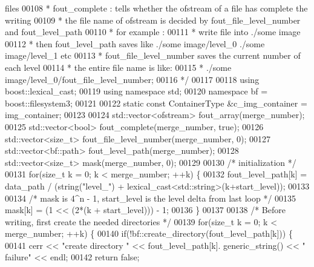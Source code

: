\begin{DoxyCode}
{       files}
00108 \textcolor{comment}{        *       fout\_complete : tells whether the ofstream of a file has
       complete the writing}
00109 \textcolor{comment}{        *       the file name of ofstream is decided by fout\_file\_level\_number
       and fout\_level\_path}
00110 \textcolor{comment}{        *       for example :}
00111 \textcolor{comment}{        *       write file into ./some image}
00112 \textcolor{comment}{        *       then fout\_level\_path saves like ./some image/level\_0 ./some
       image/level\_1        etc}
00113 \textcolor{comment}{        *       fout\_file\_level\_number saves the current number of each level}
00114 \textcolor{comment}{        *       the entire file name is like:}
00115 \textcolor{comment}{        *       ./some image/level\_0/fout\_file\_level\_number;}
00116 \textcolor{comment}{        */}
00117 
00118         \textcolor{keyword}{using} boost::lexical\_cast;
00119         \textcolor{keyword}{using namespace }std;
00120         \textcolor{keyword}{namespace }bf = boost::filesystem3;
00121 
00122         \textcolor{keyword}{static} \textcolor{keyword}{const} ContainerType &c\_img\_container = img\_container;
00123 
00124         std::vector<ofstream> fout\_array(merge\_number);
00125         std::vector<bool> fout\_complete(merge\_number, \textcolor{keyword}{true});
00126         std::vector<size\_t> fout\_file\_level\_number(merge\_number, 0);
00127         std::vector<bf::path> fout\_level\_path(merge\_number);
00128         std::vector<size\_t> mask(merge\_number, 0);
00129 
00130         \textcolor{comment}{/* initialization */}
00131         \textcolor{keywordflow}{for}(\textcolor{keywordtype}{size\_t} k = 0; k < merge\_number; ++k) \{
00132                 fout\_level\_path[k] = data\_path / (string(\textcolor{stringliteral}{"level\_"}) + 
      lexical\_cast<std::string>(k+start\_level));
00133 
00134                 \textcolor{comment}{/* mask is 4^n - 1, start\_level is the level delta from last
       loop */}
00135                 mask[k] = (1 << (2*(k + start\_level))) - 1;
00136         \}
00137 
00138         \textcolor{comment}{/* Before writing, first create the needed directories */}
00139         \textcolor{keywordflow}{for}(\textcolor{keywordtype}{size\_t} k = 0; k < merge\_number; ++k) \{
00140                 \textcolor{keywordflow}{if}(!bf::create\_directory(fout\_level\_path[k])) \{
00141                         cerr << \textcolor{stringliteral}{"create directory "} << fout\_level\_path[k].
      generic\_string() << \textcolor{stringliteral}{" failure"} << endl;
00142                         \textcolor{keywordflow}{return} \textcolor{keyword}{false};

\end{DoxyCode}
